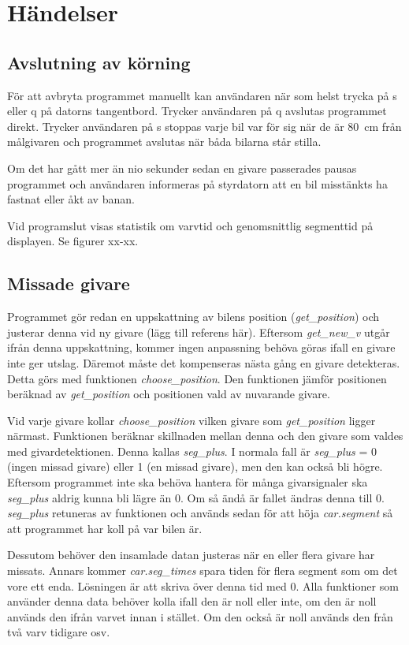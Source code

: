 \section{Händelser}

\subsection{Avslutning av körning}

För att avbryta programmet manuellt kan användaren när som helst trycka på s
eller q på datorns tangentbord. Trycker användaren på q avslutas programmet
direkt. Trycker användaren på s stoppas varje bil var för sig när de är 80~cm
från målgivaren och programmet avslutas när båda bilarna står stilla.

Om det har gått mer än nio sekunder sedan en givare passerades pausas programmet
och användaren informeras på styrdatorn att en bil misstänkts ha fastnat eller
åkt av banan. 

Vid programslut visas statistik om varvtid och genomsnittlig segmenttid på
displayen. Se figurer xx-xx.

\subsection{Missade givare}

Programmet gör redan en uppskattning av bilens position (\emph{get\_position})
 och justerar denna vid ny givare (lägg till referens här).
Eftersom \emph{get\_new\_v} utgår ifrån denna uppskattning, kommer ingen
anpassning behöva göras ifall en givare inte ger utslag. Däremot måste det 
kompenseras nästa gång en givare detekteras. Detta görs med funktionen 
\emph{choose\_position}. Den funktionen jämför positionen beräknad av 
\emph{get\_position} och positionen vald av nuvarande givare. 

Vid varje givare kollar \emph{choose\_position} vilken givare som 
\emph{get\_position} ligger närmast. Funktionen beräknar skillnaden mellan denna
och den givare som valdes med givardetektionen. Denna kallas \emph{seg\_plus}.
I normala fall är \emph{seg\_plus} = 0 (ingen 
missad givare) eller 1 (en missad givare), men den kan också bli högre. Eftersom
programmet inte ska behöva hantera för många givarsignaler ska \emph{seg\_plus}
aldrig kunna bli lägre än 0. Om så ändå är fallet ändras denna till 0. \emph{seg\_plus} 
retuneras av funktionen och används sedan för att höja \emph{car.segment} så att
programmet har koll på var bilen är.

Dessutom behöver den insamlade datan justeras när en eller flera givare har 
missats. Annars kommer \emph{car.seg\_times} spara tiden för flera segment som 
om det vore ett enda. Lösningen är att skriva över denna tid med 0. Alla 
funktioner som använder denna data behöver kolla ifall den är noll eller inte, 
om den är noll används den ifrån varvet innan i stället. Om den också är noll 
används den från två varv tidigare osv.
